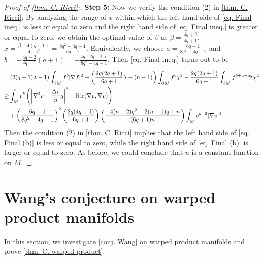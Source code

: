 \documentclass[12pt]{amsart}%
\numberwithin{equation}{section}
\numberwithin{lemma}{section}
\numberwithin{proposition}{section}
\numberwithin{corollary}{section}
\numberwithin{remark}{section}
\begin{document}
\begin{proof}[Proof of \cref{thm. C. Ricci}:]
    \textbf{Step 5:} Now we verify the condition (2) in \cref{thm. C. Ricci}: By analyzing the range of $x$ within which the left hand side of \cref{eq. Final ineq.} is less or equal to zero and the right hand side of \cref{eq. Final ineq.} is greater or equal to zero, we obtain the optimal value of $\beta$ as $\beta=\frac{4q+2}{4q+1}$, $x=\frac{\beta+4(q-1)}{4-\beta}=\frac{8q^2-4q-1}{6q+1}$. Equivalently, we choose $a=\frac{6q+1}{8q^2-4q-1}$ and $b=-\frac{4q+2}{4q+1}(a+1)=-\frac{4q(2q+1)}{8q^2-4q-1}$. Then \cref{eq. Final ineq.} turns out to be
    \begin{align}\label{eq. Final (b)}
        &\left(2(q-1)\lambda-1\right)
        \int_{\partial M}f^b|\nabla f|^2
        +\left(\frac{2q(2q+1)}{6q+1}\lambda-(n-1)\right)
        \int_{\partial M}f^b\chi^2
        -\frac{2q(2q+1)}{6q+1}\int_{\partial M}f^{b+a-aq}\chi^2\notag\\
        \geq & \int_M v^b\left(
        \left|\nabla^2 v-\frac{\Delta v}{n}g\right|^2
        +\mathrm{Ric}(\nabla v,\nabla v)
        \right)\notag\\
        &+\left(\frac{6q+1}{8q^2-4q-1}\right)^2
        \left(\frac{2q(4q+1)}{6q+1}\right)
        \left(
        \frac{-4(n-2)q^2+2(n+1)q+n}{(6q+1)n}
        \right)
        \int_M v^{b-2}|\nabla v|^4.
    \end{align}
    Then the condition (2) in \cref{thm. C. Ricci} implies that the left hand side of \cref{eq. Final (b)} is less or equal to zero, while the right hand side of \cref{eq. Final (b)} is larger or equal to zero. As before, we could conclude that $u$ is a constant function on $M$.
\end{proof}
 \section{Wang's conjecture on warped product manifolds}\label{sec3}
 In this section, we investigate \cref{conj. Wang} on warped product manifolds and prove \cref{thm. C. warped product}.
 
\end{document}
